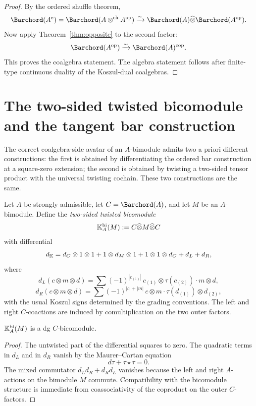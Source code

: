 \begin{proof}
By the ordered shuffle theorem,
\[
\Barchord(A^e)=\Barchord(A\chotimes A^{\op})\xrightarrow{\sim}
\Barchord(A)\widehat\otimes \Barchord(A^{\op}).
\]
Now apply Theorem~\ref{thm:opposite} to the second factor:
\[
\Barchord(A^{\op})\xrightarrow{\sim}\Barchord(A)^{\cop}.
\]
This proves the coalgebra statement. The algebra statement follows after finite-type continuous
duality of the Koszul-dual coalgebras.
\end{proof}

\section{The two-sided twisted bicomodule and the tangent bar construction}
\label{sec:tangent}

The correct coalgebra-side avatar of an $A$-bimodule admits two a priori
different constructions:
the first is obtained by differentiating the ordered bar construction at a square-zero extension;
the second is obtained by twisting a two-sided tensor product with the universal twisting cochain.
These two constructions are the same.

\begin{definition}
\label{def:Kbi}
Let $A$ be strongly admissible, let $C=\Barchord(A)$, and let $M$ be an $A$-bimodule.
Define the \emph{two-sided twisted bicomodule}
\[
\mathbb{K}_A^{\mathrm{bi}}(M):=C\widehat\otimes M\widehat\otimes C
\]
with differential
\[
d_{\mathbb{K}}
=
d_C\otimes 1\otimes 1 + 1\otimes d_M\otimes 1 + 1\otimes 1\otimes d_C + d_L+d_R,
\]
where
\[
d_L(c\otimes m\otimes d)
=
\sum (-1)^{|c_{(1)}|}\, c_{(1)}\otimes \tau(c_{(2)})\cdot m\otimes d,
\]
\[
d_R(c\otimes m\otimes d)
=
\sum (-1)^{|c|+|m|}\, c\otimes m\cdot \tau(d_{(1)})\otimes d_{(2)},
\]
with the usual Koszul signs determined by the grading conventions.
The left and right $C$-coactions are induced by comultiplication on the two outer factors.
\end{definition}

\begin{lemma}
\ClaimStatusProvedHere
\label{lem:Kbi-dg}
$\mathbb{K}_A^{\mathrm{bi}}(M)$ is a dg $C$-bicomodule.
\end{lemma}

\begin{proof}
The untwisted part of the differential squares to zero. The quadratic terms in $d_L$ and in $d_R$
vanish by the Maurer--Cartan equation
\[
d\tau+\tau\star\tau=0.
\]
The mixed commutator $d_Ld_R+d_Rd_L$ vanishes because the left and right $A$-actions on the
bimodule $M$ commute. Compatibility with the bicomodule structure is immediate from coassociativity
of the coproduct on the outer $C$-factors.
\end{proof}

